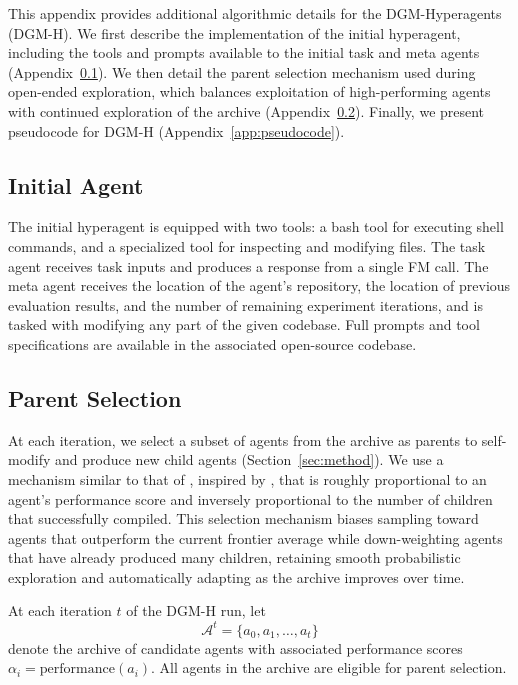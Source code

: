 This appendix provides additional algorithmic details for the DGM-Hyperagents (DGM-H). We first describe the implementation of the initial hyperagent, including the tools and prompts available to the initial task and meta agents (Appendix~\ref{app:initial-agent}). We then detail the parent selection mechanism used during open-ended exploration, which balances exploitation of high-performing agents with continued exploration of the archive (Appendix~\ref{app:parent-selection}). Finally, we present pseudocode for DGM-H (Appendix~\ref{app:pseudocode}).

\subsection{Initial Agent}
\label{app:initial-agent}

The initial hyperagent is equipped with two tools: a bash tool for executing shell commands, and a specialized tool for inspecting and modifying files. The task agent receives task inputs and produces a response from a single FM call. The meta agent receives the location of the agent's repository, the location of previous evaluation results, and the number of remaining experiment iterations, and is tasked with modifying any part of the given codebase. Full prompts and tool specifications are available in the associated open-source codebase.

\subsection{Parent Selection}
\label{app:parent-selection}

At each iteration, we select a subset of agents from the archive as parents to self-modify and produce new child agents (Section~\ref{sec:method}). We use a mechanism similar to that of \citet{zhang2025darwin}, inspired by \citet{ecoffet2019go}, that is roughly proportional to an agent's performance score and inversely proportional to the number of children that successfully compiled. This selection mechanism biases sampling toward agents that outperform the current frontier average while down-weighting agents that have already produced many children, retaining smooth probabilistic exploration and automatically adapting as the archive improves over time.

At each iteration $t$ of the DGM-H run, let
\[
\mathcal{A}^t = \{a_0, a_1, \dots, a_t\}
\]
denote the archive of candidate agents with associated performance scores
$\alpha_i = \mathrm{performance}(a_i)$.
All agents in the archive are eligible for parent selection.

